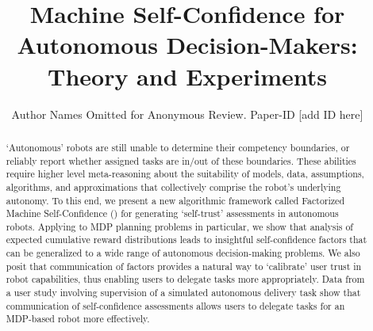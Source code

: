 \documentclass[conference,10pt]{IEEEtran}
\begin{document}
\title{Machine Self-Confidence for Autonomous Decision-Makers: Theory and Experiments}
\author{Author Names Omitted for Anonymous Review. Paper-ID [add ID here]} 

\maketitle

\begin{abstract}
    `Autonomous' robots are still unable to determine their competency boundaries, or reliably report whether assigned tasks are in/out of these boundaries. 
    These abilities require higher level meta-reasoning about the suitability of models, data, assumptions, algorithms, and approximations that collectively comprise the robot's underlying autonomy. To this end, we present a new algorithmic framework called Factorized Machine Self-Confidence (\famsec{}) for generating `self-trust' assessments in autonomous robots. Applying \famsec{} to MDP planning problems in particular, we show that analysis of expected cumulative reward distributions leads to insightful self-confidence factors that can be generalized to a wide range of autonomous decision-making problems. We also posit that communication of \famsec{} factors provides a natural way to `calibrate' user trust in robot capabilities, thus enabling users to delegate tasks more appropriately. Data from a user study involving supervision of a simulated autonomous delivery task show that communication of self-confidence assessments allows users to delegate tasks for an MDP-based robot more effectively. %
\end{abstract}

\IEEEpeerreviewmaketitle











\appendices

\end{document}
